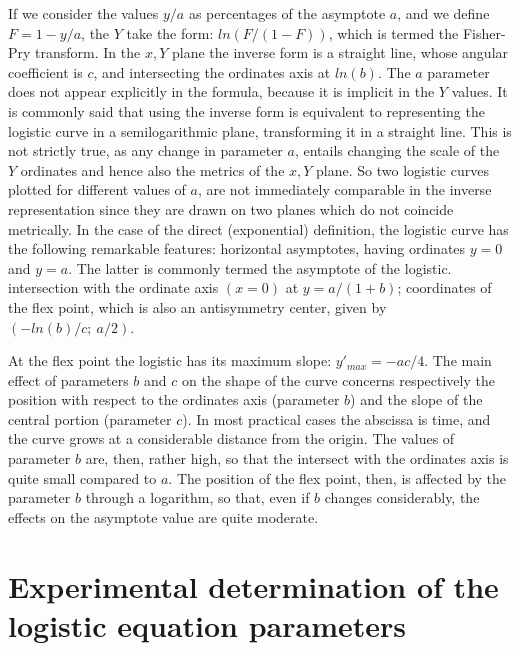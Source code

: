 \documentclass[%
 aip,
 jmp,%
 amsmath,amssymb,
 reprint,%
]{revtex4-1}
\begin{document}
If we consider the values $y/a$ as percentages of the asymptote $a$,  and we define $F = 1 - y/a$, the $Y$ take the form: $ln(F /(1 - F))$, which  is termed the Fisher-Pry transform. In the $x, Y$ plane the inverse form is a straight line, whose angular coefficient is $c$, and intersecting  the ordinates axis at $ln(b)$. The $a$ parameter does not appear explicitly in the formula, because it is implicit in the $Y$ values.
It is  commonly said  that  using  the inverse  form  is  equivalent  to representing the logistic curve in a semilogarithmic plane, transforming it in a  straight line. This is not strictly true, as any change in parameter  $a$, entails changing the  scale of  the $Y$ ordinates and hence also the metrics of the  $x, Y$  plane.
So two logistic curves plotted  for different values of $a$, are  not immediately comparable  in the  inverse  representation since  they  are drawn on two planes which do not coincide metrically. In the case of the  direct (exponential) definition, the logistic  curve has the following remarkable features: 
horizontal asymptotes, having ordinates $y = 0$ and $y = a$. The latter is commonly termed the asymptote of the logistic.
intersection with the ordinate axis $(x = 0)$ at  $y = a / (1 + b)$;
coordinates of the flex point, which is also an antisymmetry center, given by  $(-ln(b)/c;\ a/2)$.

At the flex point the logistic has its maximum slope: $y'_{max} = - ac/4$. The main effect of parameters $b$ and $c$  on the shape  of the  curve concerns respectively the position with respect to the ordinates axis (parameter $b$) and the slope of the central portion (parameter $c$).
In most practical cases the abscissa is time,  and the curve grows at a considerable distance from the origin. The values of  parameter $b$ are, then, rather high, so that the intersect with the ordinates axis is quite small compared to $a$.  The position of the flex point, then, is affected  by the parameter $b$ through a logarithm, so that,  even if $b$ changes considerably, the effects on the asymptote value are quite moderate.


\section{\label{sec:level1}Experimental determination of the logistic equation parameters}
\end{document}
